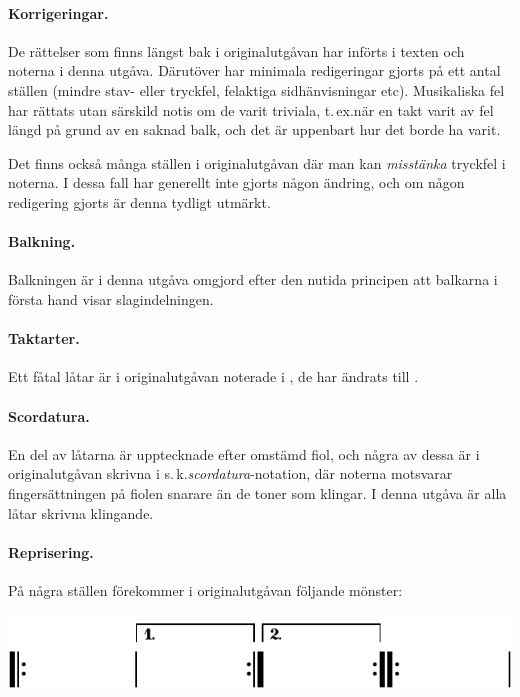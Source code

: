 {\paragraph{Korrigeringar.} De rättelser som finns längst bak i originalutgåvan har
införts i texten och noterna i denna utgåva. Därutöver har minimala redigeringar
gjorts på ett antal ställen (mindre stav- eller tryckfel, felaktiga sidhänvisningar etc).
\guillemotright{}Musikaliska fel\guillemotright{} har rättats utan särskild notis
om de varit \guillemotright{}triviala\guillemotright{}, t.\,ex.\@ när en takt
varit av fel längd på grund av en saknad balk, och det är uppenbart hur det borde ha varit.

Det finns också många ställen i originalutgåvan där man kan \textit{misstänka}
tryckfel i noterna. I dessa fall har generellt inte gjorts någon ändring, och
om någon redigering gjorts är denna tydligt utmärkt.

\paragraph{Balkning.} Balkningen är i denna utgåva omgjord efter den nutida principen
att balkarna i första hand visar slagindelningen.

\begingroup
{}
\paragraph{Taktarter.} Ett fåtal låtar är i originalutgåvan noterade i ,
de har ändrats till .
\endgroup

\paragraph{Scordatura.} En del av låtarna är upptecknade efter omstämd fiol, och några av
dessa är i originalutgåvan skrivna i s.\,k.\@ \textit{scordatura}-notation, där noterna
motsvarar fingersättningen på fiolen snarare än de toner som klingar. I denna
utgåva är alla låtar skrivna klingande.

\paragraph{Reprisering.} På några ställen förekommer i originalutgåvan följande mönster:

\vspace{3mm}
\includegraphics{include/snippets/repriser-fel-crop.pdf}
\vspace{3mm}

}
